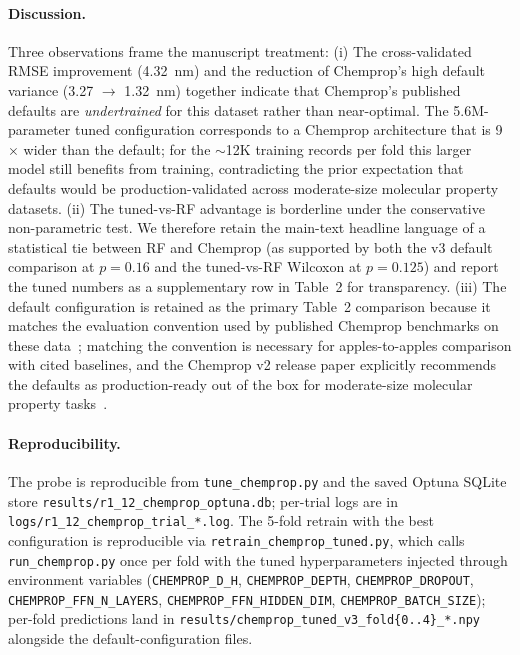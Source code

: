 \documentclass[journal=jcisd8,manuscript=suppinfo]{achemso}
\begin{document}
\paragraph{Discussion.}
Three observations frame the manuscript treatment:
(i) The cross-validated RMSE improvement (4.32~nm) and the reduction of Chemprop's high default variance (3.27 $\to$ 1.32~nm) together indicate that Chemprop's published defaults are \emph{undertrained} for this dataset rather than near-optimal. The 5.6M-parameter tuned configuration corresponds to a Chemprop architecture that is 9$\times$ wider than the default; for the $\sim$12K training records per fold this larger model still benefits from training, contradicting the prior expectation that defaults would be production-validated across moderate-size molecular property datasets.
(ii) The tuned-vs-RF advantage is borderline under the conservative non-parametric test. We therefore retain the main-text headline language of a statistical tie between RF and Chemprop (as supported by both the v3 default comparison at $p = 0.16$ and the tuned-vs-RF Wilcoxon at $p = 0.125$) and report the tuned numbers as a supplementary row in Table~2 for transparency.
(iii) The default configuration is retained as the primary Table~2 comparison because it matches the evaluation convention used by published Chemprop benchmarks on these data~\cite{joung2021deep,beard2019comparative,greenman2022multifidelity,jung2024machine,chempropv2_2024}; matching the convention is necessary for apples-to-apples comparison with cited baselines, and the Chemprop v2 release paper explicitly recommends the defaults as production-ready out of the box for moderate-size molecular property tasks~\cite{chempropv2_2024}.

\paragraph{Reproducibility.}
The probe is reproducible from \texttt{tune\_chemprop.py} and the saved Optuna SQLite store \texttt{results/r1\_12\_chemprop\_optuna.db}; per-trial logs are in \texttt{logs/r1\_12\_chemprop\_trial\_*.log}. The 5-fold retrain with the best configuration is reproducible via \texttt{retrain\_chemprop\_tuned.py}, which calls \texttt{run\_chemprop.py} once per fold with the tuned hyperparameters injected through environment variables (\texttt{CHEMPROP\_D\_H}, \texttt{CHEMPROP\_DEPTH}, \texttt{CHEMPROP\_DROPOUT}, \texttt{CHEMPROP\_FFN\_N\_LAYERS}, \texttt{CHEMPROP\_FFN\_HIDDEN\_DIM}, \texttt{CHEMPROP\_BATCH\_SIZE}); per-fold predictions land in \texttt{results/chemprop\_tuned\_v3\_fold\{0..4\}\_*.npy} alongside the default-configuration files.
\end{document}
